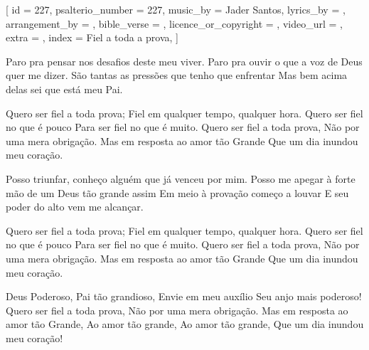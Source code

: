 
[
    id                     = {227},
    psalterio_number       = {227},
    music_by               = {Jader Santos},
    lyrics_by              = {},
    arrangement_by         = {},
    bible_verse            = {},
    licence_or_copyright   = {},
    video_url              = {},
    extra                  = {},
    index                  = {Fiel a toda a prova},
]


\beginverse

Paro pra pensar nos desafios deste meu viver.
Paro pra ouvir o que a voz de Deus quer me dizer.
São tantas as pressões 
que tenho que enfrentar
Mas bem acima delas 
sei que está meu Pai.

\endverse


\beginchorus
Quero ser fiel a toda prova;
Fiel em qualquer tempo, qualquer hora.
Quero ser fiel no que é pouco
Para ser fiel no que é muito.
Quero ser fiel a toda prova,
Não por uma mera obrigação.
Mas em resposta ao amor tão Grande
Que um dia inundou meu coração.
\endchorus


\beginverse
Posso triunfar, conheço alguém que já venceu por mim.
Posso me apegar à forte mão de um Deus tão grande assim
Em meio à provação começo a louvar
E seu poder do alto vem me alcançar.
\endverse


\beginchorus
Quero ser fiel a toda prova;
Fiel em qualquer tempo, qualquer hora.
Quero ser fiel no que é pouco
Para ser fiel no que é muito.
Quero ser fiel a toda prova,
Não por uma mera obrigação.
Mas em resposta ao amor tão Grande
Que um dia inundou meu coração.
\endchorus



\beginverse
Deus Poderoso, Pai tão grandioso,
Envie em meu auxílio Seu anjo mais poderoso!
Quero ser fiel a toda prova,
Não por uma mera obrigação.
Mas em resposta ao amor tão Grande,
Ao amor tão grande,
Ao amor tão grande,
Que um dia inundou meu coração!
\endverse


\endsong
